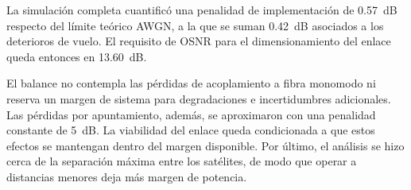 La simulaci\'on completa cuantific\'o una penalidad de implementaci\'on de
\SI{0.57}{\dB} respecto del l\'imite te\'orico AWGN, a la que se suman
\SI{0.42}{\dB} asociados a los deterioros de vuelo. El requisito de OSNR para
el dimensionamiento del enlace queda entonces en \SI{13.60}{\dB}.

El balance no contempla las p\'erdidas de acoplamiento a fibra monomodo ni
reserva un margen de sistema para degradaciones e incertidumbres adicionales.
Las p\'erdidas por apuntamiento, adem\'as, se aproximaron con una penalidad
constante de \SI{5}{\dB}. La viabilidad del enlace queda condicionada a que
estos efectos se mantengan dentro del margen disponible. Por \'ultimo, el
an\'alisis se hizo cerca de la separaci\'on m\'axima entre los sat\'elites, de
modo que operar a distancias menores deja m\'as margen de potencia.
